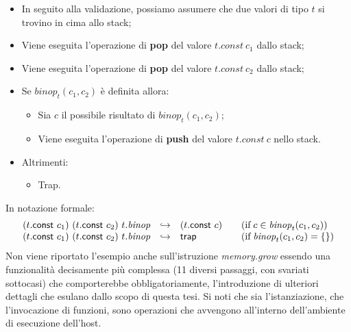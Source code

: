 \begin{itemize}
        \item In seguito alla validazione, possiamo assumere che due valori di tipo \(t\) si trovino in cima allo stack;
        \item Viene eseguita l'operazione di \textbf{pop} del valore \(t.const~c_1\) dallo stack;
        \item Viene eseguita l'operazione di \textbf{pop} del valore \(t.const~c_2\) dallo stack;
        \item Se \({\mathit{binop}}_t(c_1, c_2)\) è definita allora:
        \begin{itemize}
                \item Sia \(c\) il possibile risultato di \({\mathit{binop}}_t(c_1, c_2)\);
                \item Viene eseguita l'operazione di \textbf{push} del valore \(t.const~c\) nello stack.
        \end{itemize}
        \item Altrimenti:
        \begin{itemize}
                \item Trap.
        \end{itemize}
\end{itemize}
In notazione formale:
\begin{equation*}
        \begin{split}\begin{array}{lcl@{\qquad}l}
                (t\mathsf{.}{\mathsf{const}}~c_1)~(t\mathsf{.}{\mathsf{const}}~c_2)~t\mathsf{.}{\mathit{binop}} &{\hookrightarrow}& (t\mathsf{.}{\mathsf{const}}~c)
                  & (\mathrel{\mbox{if}} c \in {\mathit{binop}}_t(c_1,c_2)) \\
                (t\mathsf{.}{\mathsf{const}}~c_1)~(t\mathsf{.}{\mathsf{const}}~c_2)~t\mathsf{.}{\mathit{binop}} &{\hookrightarrow}& {\mathsf{trap}}
                  & (\mathrel{\mbox{if}} {\mathit{binop}}_{t}(c_1,c_2) = \{\})
                \end{array}\end{split}
\end{equation*}
Non viene riportato l'esempio anche sull'istruzione \emph{memory.grow} essendo una funzionalità decisamente più complessa (11 diversi passaggi, con svariati sottocasi) che comporterebbe obbligatoriamente, l'introduzione di ulteriori dettagli che esulano dallo scopo di questa tesi.
\break
Si noti che sia l'istanziazione, che l'invocazione di funzioni, sono operazioni che avvengono all'interno dell'ambiente di esecuzione dell'host.
